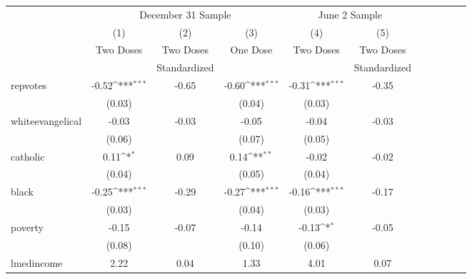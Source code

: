 \begin{minipage}{6.25in}
	\centering
	\def\sym#1{\ifmmode^{#1}\else\(^{#1}\)\fi}
	\def\arraystretch{1.1}
	\begin{tabular}{l*{5}{cc}}
	\hline\hline
				&\multicolumn{3}{c}{December 31 Sample}     & \multicolumn{2}{c}{June 2 Sample}\\
				\cmidrule{2-4}\cmidrule(l{1ex}r{1ex}){5-6}
	            &\multicolumn{1}{c}{(1)}         &\multicolumn{1}{c}{(2)}&\multicolumn{1}{c}{(3)}         &\multicolumn{1}{c}{(4)}         &\multicolumn{1}{c}{(5)}\\
	            &        \multirow{2}{*}{Two Doses}        &    Two Doses    &       \multirow{2}{*}{One Dose}         &        \multirow{2}{*}{Two Doses}         &        Two Doses\\
	            &&Standardized&&&Standardized\\ 
	\hline
	\multirow{2}{*}{repvotes}&       -0.52\sym{***}&       -0.65&       -0.60\sym{***}&       -0.31\sym{***}&       -0.35\\
	            &      (0.03)         &            &      (0.04)         &      (0.03)         &            \\
	\multirow{2}{*}{whiteevangelical}&       -0.03         &       -0.03&       -0.05         &       -0.04         &       -0.03\\
	            &      (0.06)         &            &      (0.07)         &      (0.05)         &            \\
	\multirow{2}{*}{catholic}    &        0.11\sym{*}  &        0.09&        0.14\sym{**} &       -0.02         &       -0.02\\
	            &      (0.04)         &            &      (0.05)         &      (0.04)         &            \\
	\multirow{2}{*}{black}       &       -0.25\sym{***}&       -0.29&       -0.27\sym{***}&       -0.16\sym{***}&       -0.17\\
	            &      (0.03)         &            &      (0.04)         &      (0.03)         &            \\
	\multirow{2}{*}{poverty}     &       -0.15         &       -0.07&       -0.14         &       -0.13\sym{*}  &       -0.05\\
	            &      (0.08)         &            &      (0.10)         &      (0.06)         &            \\
	\multirow{2}{*}{lmedincome}  &        2.22         &        0.04&        1.33         &        4.01         &        0.07\\

\end{tabular}
\end{minipage}
